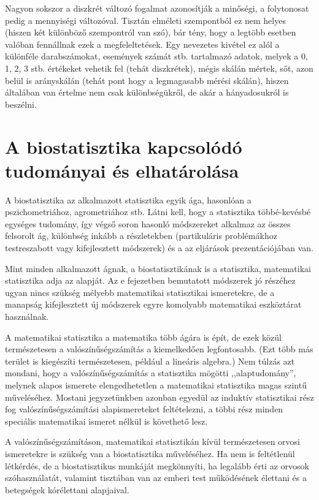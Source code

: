 \documentclass[
]{book}
\begin{document}
Nagyon sokszor a diszkrét változó fogalmat azonosítják a minőségi, a folytonosat pedig a mennyiségi változóval. Tisztán elméleti szempontból ez nem helyes (hiszen két különböző szempontról van szó), bár tény, hogy a legtöbb esetben valóban fennállnak ezek a megfeleltetések. Egy nevezetes kivétel ez alól a különféle darabszámokat, események számát stb. tartalmazó adatok, melyek a 0, 1, 2, 3 stb. értékeket vehetik fel (tehát diszkrétek), mégis skálán mértek, sőt, azon belül is arányskálán (tehát pont hogy a legmagasabb mérési skálán), hiszen általában van értelme nem csak különbségükről, de akár a hányadosukról is beszélni.

\hypertarget{alapokvelhatarolas}{%
\section{A biostatisztika kapcsolódó tudományai és elhatárolása}\label{alapokvelhatarolas}}

A biostatisztika az alkalmazott statisztika egyik ága, hasonlóan a pszichometriához, agrometriához stb. Látni kell, hogy a statisztika többé-kevésbé egységes tudomány, így végső soron hasonló módszereket alkalmaz az összes felsorolt ág, különbség inkább a részletekben (partikuláris problémákhoz testreszabott vagy kifejlesztett módszerek) és a az eljárások prezentációjában van.

Mint minden alkalmazott ágnak, a biostatisztikának is a statisztika, matematikai statisztika adja az alapját. Az e fejezetben bemutatott módszerek jó részéhez ugyan nincs szükség mélyebb matematikai statisztikai ismeretekre, de a manapság kifejlesztett új módszerek egyre komolyabb matematikai eszköztárat használnak.

A matematikai statisztika a matematika több ágára is épít, de ezek közül természetesen a valószínűségszámítás a kiemelkedően legfontosabb. (Ezt több más terület is kiegészíti természetesen, például a lineáris algebra.) Nem túlzás azt mondani, hogy a valószínűségszámítás a statisztika mögötti ,,alaptudomány'', melynek alapos ismerete elengedhetetlen a matematikai statisztika magas szintű műveléséhez. Mostani jegyzetünkben azonban egyedül az induktív statisztikai rész fog valószínűségszámítási alapismereteket feltételezni, a többi rész minden speciális matematikai ismeret nélkül is követhető lesz.

A valószínűségszámításon, matematikai statisztikán kívül természetesen orvosi ismeretekre is szükség van a biostatisztika műveléséhez. Ha nem is feltétlenül létkérdés, de a biostatisztikus munkáját megkönnyíti, ha legalább érti az orvosok szóhasználatát, valamint tisztában van az emberi test működésének élettani és a betegségek kórélettani alapjaival.
\end{document}
